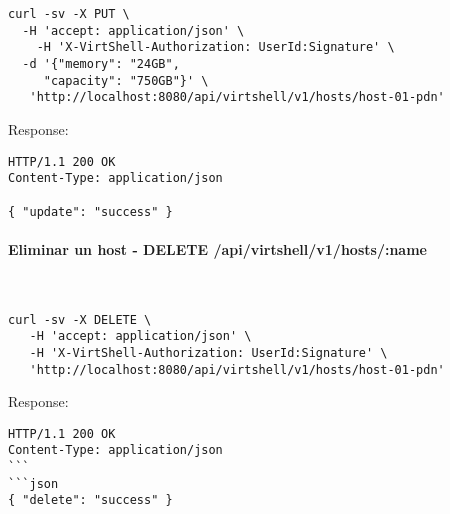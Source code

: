 \begin{lstlisting}[style=json]
curl -sv -X PUT \
  -H 'accept: application/json' \
    -H 'X-VirtShell-Authorization: UserId:Signature' \
  -d '{"memory": "24GB",
     "capacity": "750GB"}' \
   'http://localhost:8080/api/virtshell/v1/hosts/host-01-pdn'
\end{lstlisting}

Response:

\begin{lstlisting}[style=json]
HTTP/1.1 200 OK
Content-Type: application/json

{ "update": "success" }
\end{lstlisting}

\paragraph{Eliminar un host - DELETE /api/virtshell/v1/hosts/:name} ~\\

\begin{lstlisting}[style=json]
curl -sv -X DELETE \
   -H 'accept: application/json' \
   -H 'X-VirtShell-Authorization: UserId:Signature' \
   'http://localhost:8080/api/virtshell/v1/hosts/host-01-pdn'
\end{lstlisting}

Response:

\begin{lstlisting}[style=json]
HTTP/1.1 200 OK
Content-Type: application/json
```
```json
{ "delete": "success" }
\end{lstlisting}